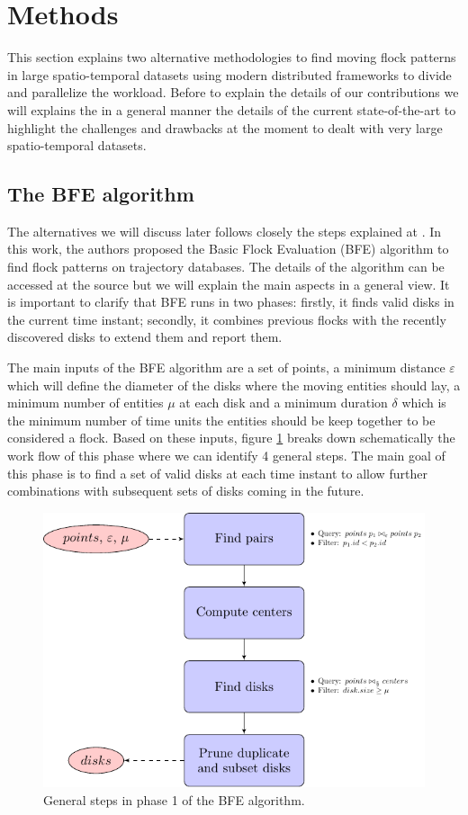
\section{Methods}
This section explains two alternative methodologies to find moving flock patterns in large spatio-temporal datasets using modern distributed frameworks to
divide and parallelize the workload.  Before to explain the details of our contributions we will explains the in a general manner the details of the current
state-of-the-art to highlight the challenges and drawbacks at the moment to dealt with very large spatio-temporal datasets.

\subsection{The BFE algorithm}
The alternatives we will discuss later follows closely the steps explained at \cite{vieira_2009}.  In this work, the authors proposed the Basic Flock Evaluation (BFE) algorithm to find flock patterns on trajectory databases.  The details of the algorithm can be accessed at the source but we will explain the main aspects in a general view.  It is important to clarify that BFE runs in two phases: firstly, it finds valid disks in the current time instant; secondly, it combines previous flocks with the recently discovered disks to extend them and report them.  

The main inputs of the BFE algorithm are a set of points, a minimum distance $\varepsilon$ which will define the diameter of the disks where the moving entities should lay, a minimum number of entities $\mu$ at each disk and a minimum duration $\delta$ which is the minimum number of time units the entities should be keep together to be considered a flock.  Based on these inputs,  figure \ref{fig:MF_flowchart} breaks down schematically the work flow  of this phase where we can identify 4 general steps.  The main goal of this phase is to find a set of valid disks at each time instant to allow further combinations with subsequent sets of disks coming in the future.

\begin{figure}
    \centering
    \includegraphics[width=\linewidth]{figures/MF_flowchart}
    \caption{General steps in phase 1 of the BFE algorithm.}\label{fig:MF_flowchart}
\end{figure}

